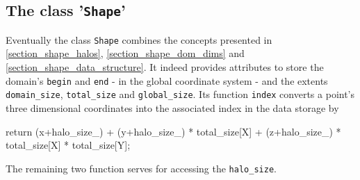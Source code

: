 \subsection{The class '\texttt{Shape}'}
Eventually the class \verb|Shape| combines the concepts presented in \ref{section_shape_halos}, \ref{section_shape_dom_dims} and \ref{section_shape_data_structure}. It indeed provides attributes to store the domain's \verb|begin| and \verb|end| - in the global coordinate system - and the extents \verb|domain_size|, \verb|total_size| and \verb|global_size|. Its function \verb|index| converts a point's three dimensional coordinates into the associated index in the data storage by 
\begin{codelisting1}
	return (x+halo_size_) + (y+halo_size_) * total_size[X] + 
				   (z+halo_size_) * total_size[X] * total_size[Y];
\end{codelisting1}
The remaining two function serves for accessing the \verb|halo_size|.
\begin{figure}[h!]
	\centering
	\def\scale{0.8}
	\def\x{0}
\end{figure}


